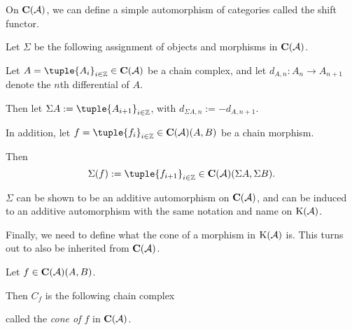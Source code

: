 On \( \C(\Ac) \), we can define a simple automorphism of categories called the shift functor.

\begin{definition}
    \label{def:chain_complex_shift}
    Let \( \Sigma \) be the following assignment of objects and morphisms in \( \C(\Ac) \).

    Let \( A = \tuple{A_i}_{i \in \Zb} \in \C(\Ac) \) be a chain complex, and let \( d_{A, n}: A_n \to A_{n + 1} \) denote the \( n \)th differential of \( A \).

    Then let \( \Sigma A := \tuple{A_{i + 1}}_{i \in \Zb} \), with \( d_{\Sigma A, n} := -d_{A, n + 1} \).

    In addition, let \( f = \tuple{f_i}_{i \in \Zb} \in \C(\Ac)(A, B) \) be a chain morphism.
    
    Then
    \[
        \Sigma(f) := \tuple{f_{i + 1}}_{i \in \Zb} \in \C(\Ac)(\Sigma A, \Sigma B).
    \]
\end{definition}

\( \Sigma \) can be shown to be an additive automorphism on \( \C(\Ac) \), and can be induced to an additive automorphism with the same notation and name on \( \operatorname{K}({\mathcal{A}}) \).

Finally, we need to define what the cone of a morphism in \( \operatorname{K}({\mathcal{A}}) \) is. This turns out to also be inherited from \( \C(\Ac) \).

\begin{definition}[Cone in \( \C(\Ac) \)]
    Let \( f \in \operatorname{\mathbf{C}}({\mathcal{A}})(A, B) \).

    Then \( C_f \) is the following chain complex
    \begin{center}
    \end{center}
    called the \emph{cone of \( f \)} in \( \C(\Ac) \).
\end{definition}

